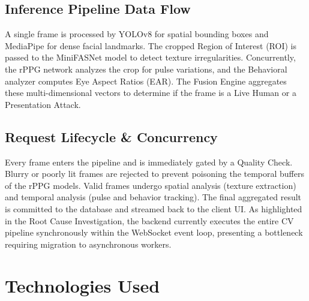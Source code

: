 \documentclass[12pt, a4paper]{report}
\begin{document}
\section{Inference Pipeline Data Flow}
A single frame is processed by YOLOv8 for spatial bounding boxes and MediaPipe for dense facial landmarks. The cropped Region of Interest (ROI) is passed to the MiniFASNet model to detect texture irregularities. Concurrently, the rPPG network analyzes the crop for pulse variations, and the Behavioral analyzer computes Eye Aspect Ratios (EAR). The Fusion Engine aggregates these multi-dimensional vectors to determine if the frame is a Live Human or a Presentation Attack.

\section{Request Lifecycle \& Concurrency}
Every frame enters the pipeline and is immediately gated by a Quality Check. Blurry or poorly lit frames are rejected to prevent poisoning the temporal buffers of the rPPG models. Valid frames undergo spatial analysis (texture extraction) and temporal analysis (pulse and behavior tracking). The final aggregated result is committed to the database and streamed back to the client UI. As highlighted in the Root Cause Investigation, the backend currently executes the entire CV pipeline synchronously within the WebSocket event loop, presenting a bottleneck requiring migration to asynchronous workers.

\chapter{Technologies Used}
\end{document}
